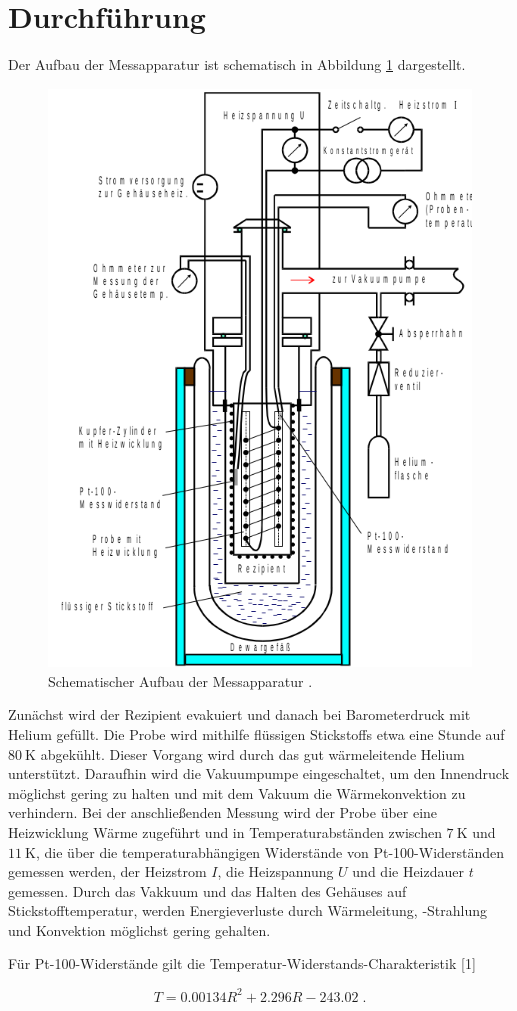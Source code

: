 \section{Durchführung}
\label{sec:Durchführung}

Der Aufbau der Messapparatur ist schematisch in Abbildung \ref{fig:aufbau} dargestellt.


\begin{figure}
    \centering
    \includegraphics[scale = 0.7]{content/plot2.png}
    \caption{Schematischer Aufbau der Messapparatur \cite{Anleitung}.}
    \label{fig:aufbau}
  \end{figure}


Zunächst wird der Rezipient evakuiert und danach bei Barometerdruck mit Helium gefüllt.
Die Probe wird mithilfe flüssigen Stickstoffs etwa eine Stunde auf $\SI{80}{\kelvin}$ abgekühlt.
Dieser Vorgang wird durch das gut wärmeleitende Helium unterstützt.
Daraufhin wird die Vakuumpumpe eingeschaltet, um den Innendruck möglichst gering zu halten und
mit dem Vakuum die Wärmekonvektion zu verhindern.
Bei der anschließenden Messung wird der Probe über eine Heizwicklung Wärme zugeführt und in 
Temperaturabständen zwischen $\SI{7}{\kelvin}$ und $\SI{11}{\kelvin}$, die über die temperaturabhängigen
 Widerstände von Pt-100-Widerständen gemessen werden, der Heizstrom $I$, die Heizspannung $U$ und die
 Heizdauer $t$ gemessen.
 Durch das Vakkuum und das Halten des Gehäuses auf Stickstofftemperatur, werden Energieverluste durch
 Wärmeleitung, -Strahlung und Konvektion möglichst gering gehalten.

Für Pt-100-Widerstände gilt die Temperatur-Widerstands-Charakteristik [1]

\begin{equation}
    \label{eqn:Temp}
    T = 0.00134 R^2 + 2.296 R - 243.02 \; .
\end{equation}

